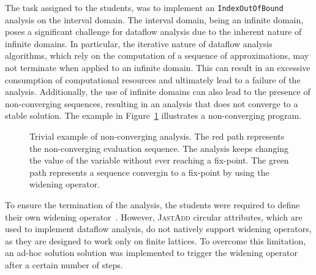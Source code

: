 The task assigned to the students, was to implement an \texttt{IndexOutOfBound} analysis on the interval domain.
The interval domain, being an infinite domain, poses a significant challenge for
dataflow analysis due to the inherent nature of infinite domains. In particular,
the iterative nature of dataflow analysis algorithms, which rely on the computation
of a sequence of approximations, may not terminate when applied to an infinite domain.
This can result in an excessive consumption of computational resources and ultimately
lead to a failure of the analysis. Additionally, the use of infinite domains can also
lead to the presence of non-converging sequences, resulting in an analysis that does
not converge to a stable solution. The example in Figure~\ref{fig:nonConverging}
illustrates a non-converging program.
\begin{figure}
	\centering
	\caption{\label{fig:nonConverging} Trivial example of non-converging analysis.
  The {\color{red}red} path represents the non-converging evaluation sequence.
  The analysis keeps changing the value of the variable  without ever
  reaching a fix-point. The {\color{ForestGreen}green} path represents a
  sequence convergin to a fix-point by using the widening operator.
  }
\end{figure}

To ensure the termination of the analysis, the students were required to
define their own widening operator~\cite{Bagnara2003Widening}.
However, \textsc{JastAdd} circular attributes, which are used to implement dataflow
analysis, do not natively support widening operators, as they are designed
to work only on finite lattices. To overcome this limitation, an ad-hoc solution
solution was implemented to trigger the widening operator after a certain
number of steps.

